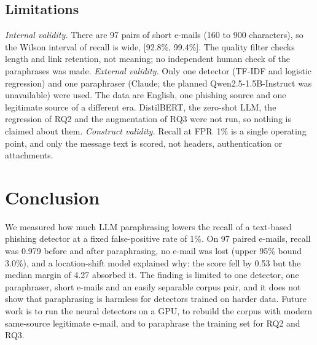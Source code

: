 \subsection{Limitations}
\emph{Internal validity.} There are 97 pairs of short e-mails (160 to 900 characters), so the Wilson interval of recall is wide, [92.8\%, 99.4\%]. The quality filter checks length and link retention, not meaning; no independent human check of the paraphrases was made. \emph{External validity.} Only one detector (TF-IDF and logistic regression) and one paraphraser (Claude; the planned Qwen2.5-1.5B-Instruct was unavailable) were used. The data are English, one phishing source and one legitimate source of a different era. DistilBERT, the zero-shot LLM, the regression of RQ2 and the augmentation of RQ3 were not run, so nothing is claimed about them. \emph{Construct validity.} Recall at FPR~1\% is a single operating point, and only the message text is scored, not headers, authentication or attachments.

\section{Conclusion}
\label{sec:conclusion}
We measured how much LLM paraphrasing lowers the recall of a text-based phishing detector at a fixed false-positive rate of 1\%. On 97 paired e-mails, recall was 0.979 before and after paraphrasing, no e-mail was lost (upper 95\% bound 3.0\%), and a location-shift model explained why: the score fell by 0.53 but the median margin of 4.27 absorbed it. The finding is limited to one detector, one paraphraser, short e-mails and an easily separable corpus pair, and it does not show that paraphrasing is harmless for detectors trained on harder data. Future work is to run the neural detectors on a GPU, to rebuild the corpus with modern same-source legitimate e-mail, and to paraphrase the training set for RQ2 and RQ3.
